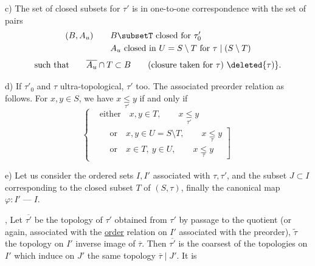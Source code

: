 c) The set of closed subsets for $\tau'$ is in one-to-one correspondence with the set of pairs
\[
\begin{aligned}
(B,A_{u}) \qquad & B\subsetT\ \text{closed for }\tau'_0\\
& A_u\ \text{closed in }U=S\setminus T\ \text{for }\tau\mid(S\setminus T)
\end{aligned}
\]
\[
\text{such that}\qquad \overline{A_u}\cap T\subset B \qquad
\text{(closure taken for }\tau\text{)}\ \deleted{\tau)}.
\]

d) If $\tau'_0$ and $\tau$ ultra-topological, $\tau'$ too. The associated preorder relation   as follows. For $x,y\in S$, we have $x\underset{\tau'}{\leq}y$ if and only if
\[
\left\{\begin{aligned}
&\text{either}\quad x,y\in T,\qquad x\underset{\tau'}{\leq}y\\
&\left.\begin{aligned}
&\text{or}\quad x,y\in U=S\setminus T,\qquad x\underset{\tau}{\leq}y\\
&\text{or}\quad x\in T,\ y\in U,\qquad x\underset{\tau}{\leq}y
\end{aligned}\right]
\end{aligned}\right.
\]

e)  Let us consider the ordered sets $I,I'$ associated with $\tau,\tau'$, and the  subset $J\subset I$ corresponding to the closed subset $T$ of $(S,\tau)$, finally the canonical map $\varphi:I'\mathbin{\text{---}}I$.

,  Let $\overline{\tau'}$  be the topology of $\tau'$ obtained from $\tau'$ by passage to the quotient (or again, associated with the \uline{order} relation on $I'$ associated with the preorder), $\widetilde{\tau}$ the topology on $I'$ inverse image of $\overline{\tau}$. Then $\overline{\tau'}$ is the coarsest of the topologies on $I'$ which  induce on $J'$ the same  topology $\overline{\tau}\mid J'$. It is
